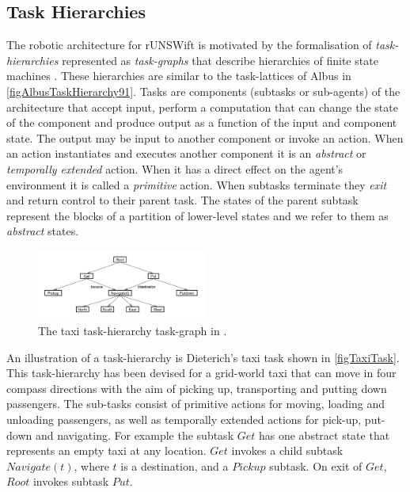 \documentclass[pdftex,11pt,a4paper]{report}
\begin{document}
\subsection{Task Hierarchies}\label{sectionTaskHierarchy}
The robotic architecture for rUNSWift is motivated by the formalisation of \emph{task-hierarchies} represented as \emph{task-graphs} \cite{Dietterich98hierarchicalreinforcement} that describe hierarchies of finite state machines \cite{hartmanis66algebraic}. These hierarchies are similar to the task-lattices of Albus in \autoref{figAlbusTaskHierarchy91}. Tasks are components (subtasks or sub-agents) of the architecture that accept input, perform a computation that can change the state of the component and produce output as a function of the input and component state. The output may be input to another component or invoke an action. When an action instantiates and executes another component it is an \emph{abstract} or \emph{temporally extended} action. When it has a direct effect on the agent's environment it is called a \emph{primitive} action. When subtasks terminate they \emph{exit} and return control to their parent task. The states of the parent subtask represent the blocks of a partition of lower-level states and we refer to them as \emph{abstract} states.  

\begin{figure}[ht]
\centering
\includegraphics[width=0.5\textwidth]{figures/TaxiTask}
\caption{The taxi task-hierarchy task-graph in  \cite{Dietterich98hierarchicalreinforcement}.} \label{figTaxiTask}
\end{figure}

An illustration of a task-hierarchy is Dieterich's taxi task shown in \autoref{figTaxiTask}. This task-hierarchy has been devised for a grid-world taxi that can move in four compass directions with the aim of picking up, transporting and putting down passengers. The sub-tasks consist of primitive actions for moving, loading and unloading passengers, as well as temporally extended actions for pick-up, put-down and navigating. For example the subtask $Get$ has one abstract state that represents an empty taxi at any location. $Get$ invokes a child subtask $Navigate(t)$, where $t$ is a destination, and a $Pickup$ subtask. On exit of $Get$, $Root$ invokes subtask $Put$. 
\end{document}

